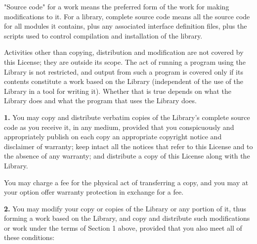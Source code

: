 "Source code" for a work means the preferred form of the work for making
modifications to it. For a library, complete source code means all the source
code for all modules it contains, plus any associated interface definition
files, plus the scripts used to control compilation and installation of the
library.

Activities other than copying, distribution and modification are not covered
by this License; they are outside its scope. The act of running a program
using the Library is not restricted, and output from such a program is covered
only if its contents constitute a work based on the Library (independent of
the use of the Library in a tool for writing it). Whether that is true depends
on what the Library does and what the program that uses the Library does.

{\bf 1.} You may copy and distribute verbatim copies of the Library's complete
source code as you receive it, in any medium, provided that you conspicuously
and appropriately publish on each copy an appropriate copyright notice and
disclaimer of warranty; keep intact all the notices that refer to this License
and to the absence of any warranty; and distribute a copy of this License
along with the Library.

You may charge a fee for the physical act of transferring a copy, and you may
at your option offer warranty protection in exchange for a fee.

{\bf 2.} You may modify your copy or copies of the Library or any portion of
it, thus forming a work based on the Library, and copy and distribute such
modifications or work under the terms of Section 1 above, provided that you
also meet all of these conditions:

